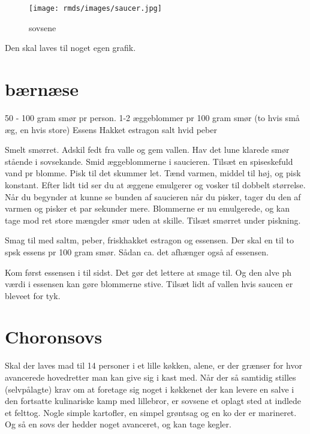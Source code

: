 \documentclass[
  letterpaper,
  DIV=11,
  numbers=noendperiod]{scrreprt}
\begin{document}
\begin{figure}

{\centering \texttt{[image: rmds/images/saucer.jpg]}

}

\caption{sovsene}

\end{figure}

Den skal laves til noget egen grafik.

\hypertarget{buxe6rnuxe6se}{%
\section{bærnæse}\label{buxe6rnuxe6se}}

50 - 100 gram smør pr person. 1-2 æggeblommer pr 100 gram smør (to hvis
små æg, en hvis store) Essens Hakket estragon salt hvid peber

Smelt smørret. Adskil fedt fra valle og gem vallen. Hav det lune klarede
smør stående i sovsekande. Smid æggeblommerne i saucieren. Tilsæt en
spiseskefuld vand pr blomme. Pisk til det skummer let. Tænd varmen,
middel til høj, og pisk konstant. Efter lidt tid ser du at æggene
emulgerer og vosker til dobbelt størrelse. Når du begynder at kunne se
bunden af saucieren når du pisker, tager du den af varmen og pisker et
par sekunder mere. Blommerne er nu emulgerede, og kan tage mod ret store
mængder smør uden at skille. Tilsæt smørret under piskning.

Smag til med saltm, peber, friskhakket estragon og essensen. Der skal en
til to spsk essens pr 100 gram smør. Sådan ca. det afhænger også af
essensen.

Kom først essensen i til sidst. Det gør det lettere at smage til. Og den
alve ph værdi i essensen kan gøre blommerne stive. Tilsæt lidt af vallen
hvis saucen er bleveet for tyk.

\hypertarget{choronsovs}{%
\section{Choronsovs}\label{choronsovs}}

Skal der laves mad til 14 personer i et lille køkken, alene, er der
grænser for hvor avancerede hovedretter man kan give sig i kast med. Når
der så samtidig stilles (selvpålagte) krav om at foretage sig noget i
køkkenet der kan levere en salve i den fortsatte kulinariske kamp med
lillebror, er sovsene et oplagt sted at indlede et felttog. Nogle simple
kartofler, en simpel grøntsag og en ko der er marineret. Og så en sovs
der hedder noget avanceret, og kan tage kegler.~
\end{document}
